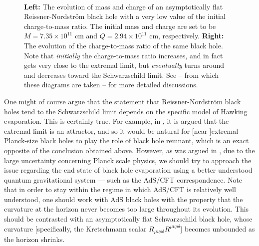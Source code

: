 \documentclass[12pt]{article}
\newcommand{\2}{$^2$}
\newcommand{\3}{$^3$}
\newcommand{\4}{$_4$}
\newcommand{\5}{$_5$}
\begin{document}
\begin{figure}[!h]
\centering
\mbox{\quad
{}}
\caption{\textbf{Left:} The evolution of mass and charge of an asymptotically flat Reissner-Nordstr\"om black hole with a very low value of the initial charge-to-mass ratio. The initial mass and charge are set to be $M=7.35 \times 10^{11}$ cm and $Q=2.94 \times 10^{11}$ cm, respectively. \textbf{Right:} The evolution of the charge-to-mass ratio of the same black hole. Note that \emph{initially} the charge-to-mass ratio increases, and in fact gets very close to the extremal limit, but \emph{eventually} turns around and decreases toward the Schwarzschild limit. See \cite{OC} -- from which these diagrams are taken -- for more detailed discussions. \label{RNevol}}
\end{figure}


One might of course argue that the statement that Reissner-Nordstr\"om black holes tend to the Schwarzschild limit depends on the specific model of Hawking evaporation. This is certainly true. For example, in \cite{kn:kimwen}, it is argued that the extremal limit is an attractor, and so it would be natural for [near-]extremal Planck-size black holes to play the role of black hole remnant, which is an exact opposite of the conclusion obtained above. However, as was argued in \cite{OMC, OC}, due to the large uncertainty concerning Planck scale physics, we should try to approach the issue regarding the end state of black hole evaporation using a better understood quantum gravitational system --- such as the AdS/CFT correspondence. Note that in order to stay within the regime in which AdS/CFT is relatively well understood, one should work with AdS black holes with the property that the curvature at the horizon never becomes too large throughout its evolution. This should be contrasted with an asymptotically flat Schwarzschild black hole, whose curvature [specifically, the Kretschmann scalar $R_{\mu\nu\rho\delta}R^{\mu\nu\rho\delta}$] becomes unbounded as the horizon shrinks. 
\end{document}
